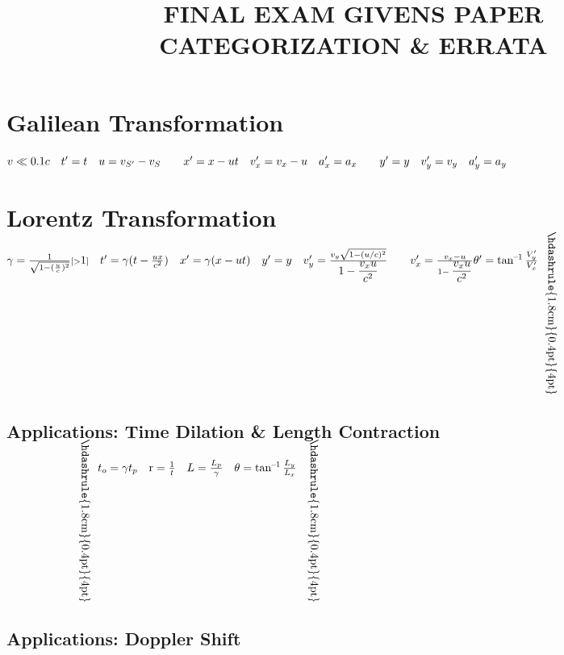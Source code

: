 \documentclass[a4paper,12pt]{article}
\title{FINAL EXAM GIVENS PAPER\\CATEGORIZATION \& ERRATA}
\newcommand{\sz}{\text{--}}
\begin{document}
\maketitle


\fontsize{12}{14}\selectfont

\section{Galilean Transformation}
\noindent
$
    v \ll 0.1c \quad t^\prime = t \quad u = v_{S^\prime} - v_S \qquad x^\prime = x - ut \quad v^\prime_x = v_x - u \quad a_x^\prime = a_x \qquad y^\prime = y \quad v^\prime_y = v_y \quad a_y^\prime = a_y\\[-8mm]
$

\section{Lorentz Transformation}
\noindent
$
    \gamma = \frac{1}{\sqrt{1- (\frac{u}{c})^2}} {\scriptstyle [>}1{\scriptstyle]} \quad t^\prime = \gamma (t - \frac{ux}{c^2}) \quad x^\prime = \gamma(x - ut) \quad  y^\prime = y \quad v^\prime_y = \frac{v_y \sqrt{1-(u/c)^2}}{\displaystyle 1- \frac{v_x u}{c^2}} \qquad v_x^\prime = \frac{v_x - u}{1- \displaystyle \frac{v_xu}{c^2}} \\
    \theta^\prime = \tan^{\sz 1}{\frac{V_y^\prime}{V_x^\prime}} ~~ \rotatebox{-90}{\hskip-1cm\hdashrule{1.8cm}{0.4pt}{4pt}} \\[-1em]
$

\subsection{Applications: Time Dilation \& Length Contraction}

\noindent
$
    \phantom{\theta^\prime = \tan^{\sz 1}{\frac{V_y^\prime}{V_x^\prime}}} ~~ \rotatebox{-90}{\hskip-1cm\hdashrule{1.8cm}{0.4pt}{4pt}} ~~ t_o = \gamma t_p \quad \text{r} = \frac{1}{t} \quad L = \frac{L_p}{\gamma} \quad \theta = \tan^{\sz1}{\frac{L_y}{L_x}} \quad \rotatebox{-90}{\hskip-1cm\hdashrule{1.8cm}{0.4pt}{4pt}}\\[-.8cm]
$


\subsection{Applications: Doppler Shift}
\end{document}
